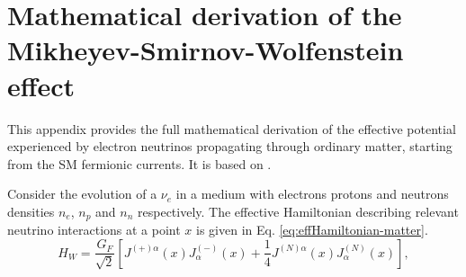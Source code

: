 \chapter{Mathematical derivation of the Mikheyev-Smirnov-Wolfenstein effect}
\label{app:MSW_derivation}
This appendix provides the full mathematical derivation of the effective potential experienced by electron neutrinos propagating through ordinary matter, starting from the \ac{SM} fermionic currents. It is based on \cite{neutrinosPDG}.

Consider the evolution of a $\nu_e$ in a medium with electrons protons and neutrons densities $n_e$, $n_p$ and $n_n$ respectively. The effective Hamiltonian describing relevant neutrino interactions at a point $x$ is given in Eq. \ref{eq:effHamiltonian-matter}.
\begin{equation}
    \label{eq:effHamiltonian-matter}
    H_W = \frac{G_F}{\sqrt{2}} \left[ J^{(+)\alpha}(x) J^{(-)}_\alpha(x) + \frac{1}{4} J^{(N)\alpha}(x) J^{(N)}_\alpha(x) \right],
\end{equation}

